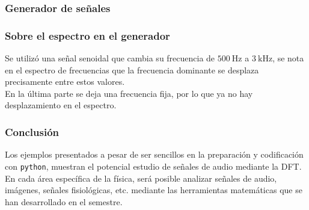\documentclass[12pt]{beamer}
\begin{document}
\begin{frame}
\frametitle{Generador de señales}
\begin{figure}
    \centering
\end{figure}
\end{frame}
\begin{frame}
\frametitle{Sobre el espectro en el generador}
Se utilizó una señal senoidal que cambia su frecuencia de $\SI{500}{\hertz}$ a $\SI{3}{\kilo\hertz}$, se nota en el espectro de frecuencias que la frecuencia dominante se desplaza precisamente entre estos valores.
\\
\bigskip
\pause
En la última parte se deja una frecuencia fija, por lo que ya no hay desplazamiento en el espectro.
\end{frame}
\begin{frame}
\frametitle{Conclusión}
Los ejemplos presentados a pesar de ser sencillos en la preparación y codificación con \texttt{python}, muestran el potencial estudio de señales de audio mediante la DFT.
\\
\bigskip
\pause
En cada área específica de la física, será posible analizar señales de audio, imágenes, señales fisiológicas, etc. mediante las herramientas matemáticas que se han desarrollado en el semestre.
\end{frame}
\end{document}
